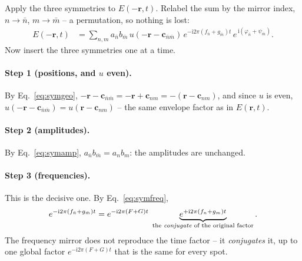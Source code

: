\documentclass[11pt,a4paper]{article}
\begin{document}
Apply the three symmetries to $E(-\mathbf r,t)$. Relabel the sum by the
mirror index, $n\to\bar n$, $m\to\bar m$ -- a permutation, so nothing is
lost:
\begin{align}
  E(-\mathbf r,t)
  &= \sum_{n,m} a_{\bar n} b_{\bar m}\,
     u(-\mathbf r - \mathbf c_{\bar n\bar m})\,
     e^{-\mathrm{i}2\pi (f_{\bar n}+g_{\bar m})t}\,
     e^{\,\mathrm{i}(\varphi_{\bar n}+\psi_{\bar m})} .
\end{align}
Now insert the three symmetries one at a time.

\paragraph{Step 1 (positions, and $u$ even).}
By Eq.~\eqref{eq:symgeo}, $-\mathbf r-\mathbf c_{\bar n\bar m}
= -\mathbf r+\mathbf c_{nm} = -(\mathbf r-\mathbf c_{nm})$, and since $u$ is
even, $u(-\mathbf r-\mathbf c_{\bar n\bar m}) = u(\mathbf r-\mathbf c_{nm})$
-- the same envelope factor as in $E(\mathbf r,t)$.

\paragraph{Step 2 (amplitudes).}
By Eq.~\eqref{eq:symamp}, $a_{\bar n}b_{\bar m} = a_n b_m$: the amplitudes
are unchanged.

\paragraph{Step 3 (frequencies).}
This is the decisive one. By Eq.~\eqref{eq:symfreq},
\begin{equation}
  e^{-\mathrm{i}2\pi (f_{\bar n}+g_{\bar m})t}
  = e^{-\mathrm{i}2\pi (F+G)t}\;
    \underbrace{e^{+\mathrm{i}2\pi (f_n+g_m)t}}_{
      \text{the \emph{conjugate} of the original factor}} .
\end{equation}
The frequency mirror does not reproduce the time factor -- it
\emph{conjugates} it, up to one global factor $e^{-\mathrm{i}2\pi(F+G)t}$
that is the same for every spot.
\end{document}
